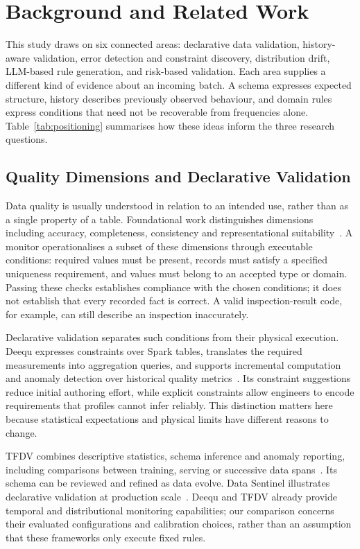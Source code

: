 \section{Background and Related Work}
\label{sec:related}

This study draws on six connected areas: declarative data validation, history-aware validation, error detection and constraint discovery, distribution drift, LLM-based rule generation, and risk-based validation. Each area supplies a different kind of evidence about an incoming batch. A schema expresses expected structure, history describes previously observed behaviour, and domain rules express conditions that need not be recoverable from frequencies alone. Table~\ref{tab:positioning} summarises how these ideas inform the three research questions.

\subsection{Quality Dimensions and Declarative Validation}

Data quality is usually understood in relation to an intended use, rather than as a single property of a table. Foundational work distinguishes dimensions including accuracy, completeness, consistency and representational suitability~\cite{WangStrong1996,Batini2009,FanGeerts2012}. A monitor operationalises a subset of these dimensions through executable conditions: required values must be present, records must satisfy a specified uniqueness requirement, and values must belong to an accepted type or domain. Passing these checks establishes compliance with the chosen conditions; it does not establish that every recorded fact is correct. A valid inspection-result code, for example, can still describe an inspection inaccurately.

Declarative validation separates such conditions from their physical execution. Deequ expresses constraints over Spark tables, translates the required measurements into aggregation queries, and supports incremental computation and anomaly detection over historical quality metrics~\cite{Schelter2018,Schelter2019}. Its constraint suggestions reduce initial authoring effort, while explicit constraints allow engineers to encode requirements that profiles cannot infer reliably. This distinction matters here because statistical expectations and physical limits have different reasons to change.

TFDV combines descriptive statistics, schema inference and anomaly reporting, including comparisons between training, serving or successive data spans~\cite{Breck2019,Caveness2020}. Its schema can be reviewed and refined as data evolve. Data Sentinel illustrates declarative validation at production scale~\cite{Swami2020}. Deequ and TFDV already provide temporal and distributional monitoring capabilities; our comparison concerns their evaluated configurations and calibration choices, rather than an assumption that these frameworks only execute fixed rules.

